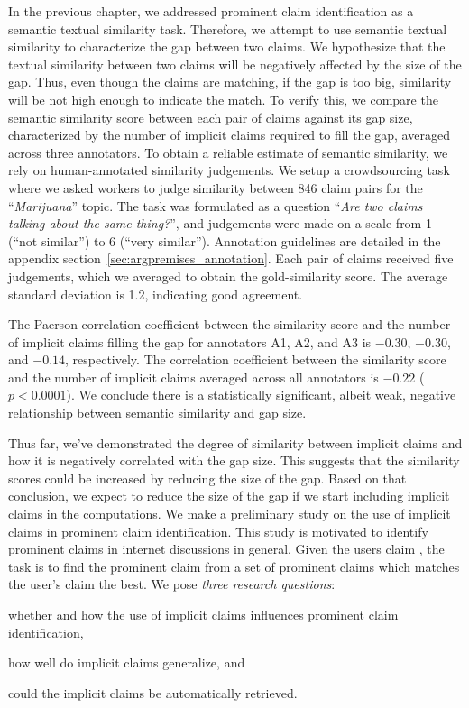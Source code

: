 In the previous chapter, we addressed prominent claim identification as a semantic
textual similarity task. 
Therefore, we attempt to use semantic textual similarity to characterize the gap
between two claims. 
We hypothesize that the textual similarity between two claims will be
negatively affected by the size of the gap. 
Thus, even though the claims are matching, if the gap is too big, similarity will be not 
high enough to indicate the match. 
To verify this, we compare the semantic similarity score between each pair of 
claims against its gap size, characterized by the number of implicit claims
required to fill the gap, 
averaged across three annotators. 
To obtain a reliable estimate of semantic similarity, we rely on human-annotated 
similarity judgements. 
We setup a crowdsourcing task where we asked workers to judge similarity
between 846 claim pairs for the ``\emph{Marijuana}'' topic. 
The task was formulated as a question ``\emph{Are two claims
talking about the same thing?}'', and judgements were made on a scale
from 1 (``not similar'') to 6 (``very similar''). 
Annotation guidelines are detailed in the appendix
section~\ref{sec:argpremises_annotation}. 
Each pair of claims received five judgements, which we averaged to obtain the
gold-similarity score. 
The average standard deviation is 1.2, indicating good agreement. 

The Paerson correlation coefficient  between the similarity score and the
number of implicit claims filling the gap for annotators A1, A2, and A3 is
$-0.30$, $-0.30$, and $-0.14$, respectively.  The correlation coefficient between the
similarity score and the number of implicit claims averaged across all annotators is
$-0.22$ ($p < 0.0001$).  We conclude there is a statistically significant,
albeit weak, negative relationship between semantic similarity and gap size. 

Thus far, we've demonstrated the degree of similarity between implicit 
claims and how it is negatively correlated with the gap size. 
This suggests that the similarity scores could be increased by reducing the size 
of the gap.
Based on that conclusion, we expect to reduce the size of the gap if we start
including implicit claims in the computations. 
We make a preliminary study on the use of implicit claims in prominent claim
identification.
This study is motivated to identify prominent claims in internet discussions in
general.
Given the users claim , the task is to find the prominent claim from a set of 
prominent claims which matches the user's claim the best. 
We pose \emph{three research questions}: 
\begin{enumerate*}[label=(\arabic*)]
\item whether and how the use of implicit claims influences prominent claim identification, 
\item how well do implicit claims generalize, and 
\item could the implicit claims be automatically retrieved.
\end{enumerate*}

